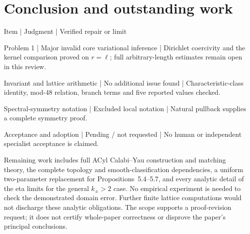 \documentclass[10pt]{article}
\begin{document}
\section*{Conclusion and outstanding work}
Item | Judgment | Verified repair or limit\par
Problem 1 | Major invalid core variational inference | Dirichlet coercivity and the kernel comparison proved on \(r=\ell\); full arbitrary-length estimates remain open in this review.\par
Invariant and lattice arithmetic | No additional issue found | Characteristic-class identity, mod-48 relation, branch terms and five reported values checked.\par
Spectral-symmetry notation | Excluded local notation | Natural pullback supplies a complete symmetry proof.\par
Acceptance and adoption | Pending / not requested | No human or independent specialist acceptance is claimed.\par
Remaining work includes full ACyl Calabi–Yau construction and matching theory, the complete topology and smooth-classification dependencies, a uniform two-parameter replacement for Propositions 5.4–5.7, and every analytic detail of the eta limits for the general \(k_\pm>2\) case. No empirical experiment is needed to check the demonstrated domain error. Further finite lattice computations would not discharge these analytic obligations. The scope supports a proof-revision request; it does not certify whole-paper correctness or disprove the paper’s principal conclusions.\par
\end{document}

